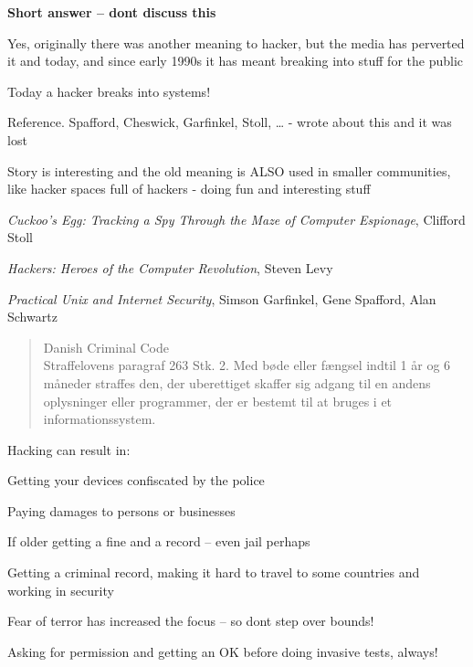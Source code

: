 \documentclass[Screen16to9,17pt]{foils}
\begin{document}

{\bfseries Short answer -- dont discuss this}

Yes, originally there was another meaning to hacker, but the media has perverted it and today, and since early 1990s it has meant breaking into stuff for the public

{\color{red}\hlkbig Today a hacker breaks into systems!}

Reference. Spafford, Cheswick, Garfinkel, Stoll, \ldots
- wrote about this and it was lost

Story is interesting and the old meaning is ALSO used in smaller communities, like hacker spaces full of hackers - doing fun and interesting stuff
\begin{list2}
\item \emph{Cuckoo's Egg: Tracking a Spy Through the Maze of Computer
 Espionage},  Clifford Stoll
\item \emph{Hackers: Heroes of the Computer Revolution},
Steven Levy
\item \emph{Practical Unix and Internet Security},
Simson Garfinkel, Gene Spafford, Alan Schwartz
\end{list2}


\begin{quote}\small
Danish Criminal Code\\
Straffelovens paragraf 263 Stk. 2. Med bøde eller fængsel indtil 1 år og 6 måneder straffes den, der uberettiget skaffer sig adgang til en andens oplysninger eller programmer, der er bestemt til at bruges i et informationssystem.
\end{quote}

Hacking can result in:
\begin{list2}
\item Getting your devices confiscated by the police
\item Paying damages to persons or businesses
\item If older getting a fine and a record -- even jail perhaps
\item Getting a criminal record, making it hard to travel to some countries and working in security
\item Fear of terror has increased the focus -- so dont step over bounds!
\end{list2}

Asking for permission and getting an OK before doing invasive tests, always!
\end{document}

